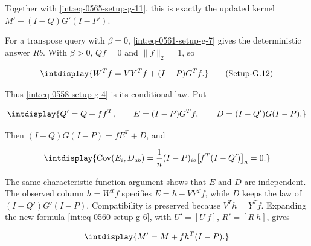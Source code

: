 
Together with \hyperref[int:eq-setup-g-11]{\eqref{int:eq-0565-setup-g-11}}, this is exactly the updated kernel \(M'+(I-Q)G'(I-P')\).



For a transpose query with \(\beta=0\), \hyperref[int:eq-setup-g-7]{\eqref{int:eq-0561-setup-g-7}} gives the deterministic answer \(Rb\). With \(\beta>0\), \(Qf=0\) and \(\|f\|_2=1\), so


\label{int:eq-setup-g-12}
\begingroup\renewcommand{\theHequation}{intdisplay.1070}
\begin{equation}
\intdisplay{
W^Tf=VY^Tf+(I-P)G^Tf.
}
\tag{Setup-G.12}
\label{int:eq-0566-setup-g-12}
\end{equation}
\endgroup


Thus \hyperref[int:eq-setup-g-4]{\eqref{int:eq-0558-setup-g-4}} is its conditional law. Put


\begingroup\renewcommand{\theHequation}{intdisplay.1071}
\begin{equation*}
\intdisplay{
Q'=Q+ff^T,\qquad
 E=(I-P)G^Tf,\qquad D=(I-Q')G(I-P).
}
\end{equation*}
\endgroup


Then \((I-Q)G(I-P)=fE^T+D\), and


\begingroup\renewcommand{\theHequation}{intdisplay.1072}
\begin{equation*}
\intdisplay{
\operatorname{Cov}(E_i,D_{ab})
 =\frac1n(I-P)_{ib}\bigl[f^T(I-Q')\bigr]_a=0.
}
\end{equation*}
\endgroup


The same characteristic-function argument shows that \(E\) and \(D\) are independent. The observed column \(h=W^Tf\) specifies \(E=h-VY^Tf\), while \(D\) keeps the law of \((I-Q')G'(I-P)\). Compatibility is preserved because \(V^Th=Y^Tf\). Expanding the new formula \hyperref[int:eq-setup-g-6]{\eqref{int:eq-0560-setup-g-6}}, with \(U'=[U\ f]\), \(R'=[R\ h]\), gives


\begingroup\renewcommand{\theHequation}{intdisplay.1073}
\begin{equation*}
\intdisplay{
M'=M+fh^T(I-P).
}
\end{equation*}
\endgroup

